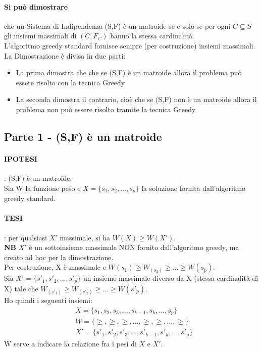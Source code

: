 \paragraph*{Si può dimostrare} che un Sistema di Indipendenza (S,F) è un matroide se e solo se
per ogni $C \subseteq S$ gli insiemi massimali di $(C, F_C)$ hanno la stessa cardinalità.\\
L'algoritmo greedy standard fornisce sempre (per costruzione) insiemi massimali.\\
La Dimostrazione è divisa in due parti:
\begin{itemize}
    \item La prima dimostra che che se (S,F) è un matroide allora il problema può essere risolto
    con la tecnica Greedy
    \item La seconda dimostra il contrario, cioè che se (S,F) non è un matroide allora il problema
    non può essere risolto tramite la tecnica Greedy
\end{itemize}
\subsection{Parte 1 - (S,F) è un matroide}
\paragraph*{IPOTESI}: (S,F) è un matroide.\\
Sia W la funzione peso e $X = \{s_1,s_2,\dots, s_p\}$ la soluzione fornita dall'algoritmo greedy
standard.
\paragraph*{TESI}: per qualsiasi $X'$ massimale, si ha $W(X) \geq W(X')$.\\
\textbf{NB} $X'$ è un sottoinsieme massimale NON fornito dall'algoritmo greedy, ma creato ad hoc per
la dimostrazione.\\
Per costruzione, X è massimale e $W(s_1) \geq W_(s_2) \geq ... \geq W(s_p)$.\\
Sia $X'=\{s'_1,s'_2,\dots,s'_p\}$ un insieme massimale diverso da X (stessa cardinalità di X) tale
che $W_(s'_1) \geq W_(s'_2) \geq \dots \geq W(s'_p)$.\\
Ho quindi i seguenti insiemi:
\begin{align*}
    &X = \{s_1, s_2, s_3, ..., s_{k-1}, s_k, ..., s_p\}\\
    &W = \{ \geq, \geq, \geq, ..., \geq, \geq, ..., \geq\}\\
    &X'= \{s'_1, s'_2, s'_3, ..., s'_{k-1}, s'_k, ..., s'_p\}
\end{align*}
W serve a indicare la relazione fra i pesi di $X$ e $X'$.
